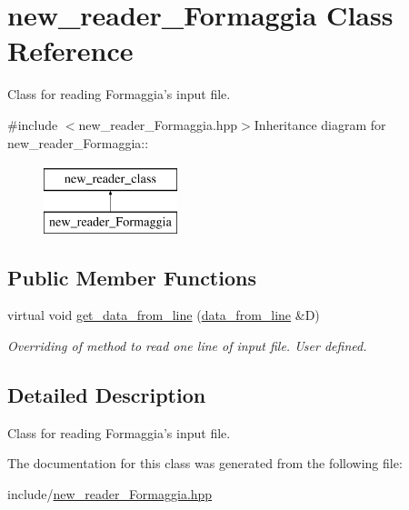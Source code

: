 \hypertarget{classnew__reader__Formaggia}{
\section{new\_\-reader\_\-Formaggia Class Reference}
\label{classnew__reader__Formaggia}
}


Class for reading Formaggia's input file.  


{\ttfamily \#include $<$new\_\-reader\_\-Formaggia.hpp$>$}Inheritance diagram for new\_\-reader\_\-Formaggia::\begin{figure}[H]
\begin{center}
\leavevmode
\includegraphics[height=2cm]{classnew__reader__Formaggia}
\end{center}
\end{figure}
\subsection*{Public Member Functions}
\begin{DoxyCompactItemize}
\item 
\hypertarget{classnew__reader__Formaggia_a88966b5769cb7ed1ce6f75072820dd38}{
virtual void \hyperlink{classnew__reader__Formaggia_a88966b5769cb7ed1ce6f75072820dd38}{get\_\-data\_\-from\_\-line} (\hyperlink{structdata__from__line}{data\_\-from\_\-line} \&D)}
\label{classnew__reader__Formaggia_a88966b5769cb7ed1ce6f75072820dd38}

\begin{DoxyCompactList}\small\item\em Overriding of method to read one line of input file. User defined. \item\end{DoxyCompactList}\end{DoxyCompactItemize}


\subsection{Detailed Description}
Class for reading Formaggia's input file. 

The documentation for this class was generated from the following file:\begin{DoxyCompactItemize}
\item 
include/\hyperlink{new__reader__Formaggia_8hpp}{new\_\-reader\_\-Formaggia.hpp}\end{DoxyCompactItemize}
